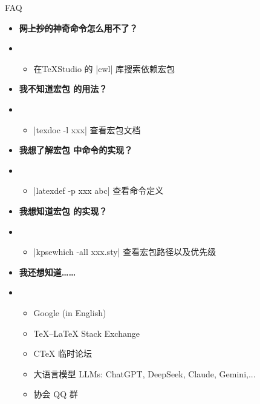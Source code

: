 \begin{frame}{FAQ}
  \begin{itemize}
    \item \textbf{ \sout{网上抄的}神奇命令怎么用不了？}\pause

    \item[] \begin{itemize}
      \item 在\TeX{}Studio 的 |cwl| 库搜索依赖宏包 
    \end{itemize}\pause

    \item \textbf{ 我不知道宏包  的用法？}\pause

    \item[] \begin{itemize}
      \item |texdoc -l xxx| 查看宏包文档
    \end{itemize}\pause

    \item \textbf{ 我想了解宏包  中命令的实现？}\pause

    \item[] \begin{itemize}
      \item |latexdef -p xxx abc| 查看命令定义
    \end{itemize}\pause

    \item \textbf{ 我想知道宏包  的实现？}\pause

    \item[] \begin{itemize}
      \item |kpsewhich -all xxx.sty| 查看宏包路径以及优先级
    \end{itemize}\pause

    \item \textbf{ 我还想知道…… }\pause

    \item[] \begin{itemize}
      \item Google (in English) 
      \item \TeX{}--\LaTeX{} Stack Exchange 
      \item C\TeX{} 临时论坛 
      \item 大语言模型 LLMs: ChatGPT, DeepSeek, Claude, Gemini,...
      \item 协会 QQ 群
    \end{itemize}
  \end{itemize}
\end{frame}


